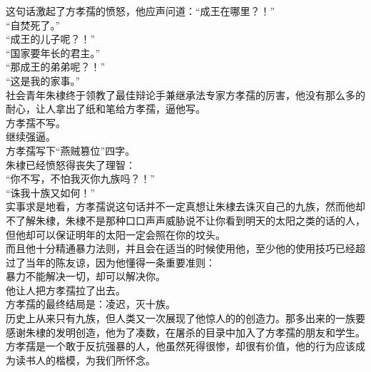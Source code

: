 \begin{multicols}{\theparacolNo}
这句话激起了方孝孺的愤怒，他应声问道：“成王在哪里？！”\\

“自焚死了。”\\

“成王的儿子呢？！”\\

“国家要年长的君主。”\\

“那成王的弟弟呢？！”\\

“这是我的家事。”\\

社会青年朱棣终于领教了最佳辩论手兼继承法专家方孝孺的厉害，他没有那么多的耐心，让人拿出了纸和笔给方孝孺，逼他写。\\

方孝孺不写。\\

继续强逼。\\

方孝孺写下“燕贼篡位”四字。\\

朱棣已经愤怒得丧失了理智：\\

“你不写，不怕我灭你九族吗？！”\\

“诛我十族又如何！”\\

实事求是地看，方孝孺说这句话并不一定真想让朱棣去诛灭自己的九族，然而他却不了解朱棣，朱棣不是那种口口声声威胁说不让你看到明天的太阳之类的话的人，但他却可以保证明年的太阳一定会照在你的坟头。\\

而且他十分精通暴力法则，并且会在适当的时候使用他，至少他的使用技巧已经超过了当年的陈友谅，因为他懂得一条重要准则：\\

暴力不能解决一切，却可以解决你。\\

他让人把方孝孺拉了出去。\\

方孝孺的最终结局是：凌迟，灭十族。\\

历史上从来只有九族，但人类又一次展现了他惊人的的创造力。那多出来的一族要感谢朱棣的发明创造，他为了凑数，在屠杀的目录中加入了方孝孺的朋友和学生。\\

方孝孺是一个敢于反抗强暴的人，他虽然死得很惨，却很有价值，他的行为应该成为读书人的楷模，为我们所怀念。\\


\end{multicols}
